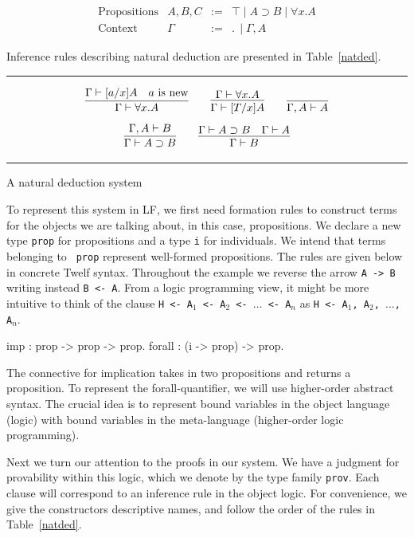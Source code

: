 \documentclass{acmconf}
\newcommand{\figfoot}{\vspace{1ex}\hrule}
\newcommand{\fighead}{\hrule\vspace{1.5ex}}
\newcommand{\impl}{\supset}
\newcommand{\ldot}{.\,}
\begin{document}
\[
\begin{array}{llll}
\mbox{Propositions} & A,B, C & := & \top \mid A \impl B \mid \forall x.A \\
\mbox{Context} & \Gamma & := & \ldot \mid \Gamma,  A
\end{array}
\]

Inference rules describing natural deduction are presented in Table~\ref{natded}.

\begin{table}[h]
\fighead
\[
\infer{\Gamma\vdash \forall x. A}
{\Gamma\vdash [a/x]A & a \mbox{ is new}}
\qquad
\infer{\Gamma\vdash [T/x]A}
{\Gamma\vdash \forall x.A}
\qquad
\infer{\Gamma, A \vdash A}
{}
\]
\[
\infer{\Gamma\vdash A\impl B}
{\Gamma,A\vdash B}
\qquad
\infer{\Gamma\vdash B}
{\Gamma\vdash A\impl B
\quad
\Gamma\vdash A}
\]
\figfoot
\caption{\label{natded}A natural deduction system}
\end{table}

To represent this system in LF, we first need formation rules to
construct terms for the objects we are talking about, in this case,
propositions. We declare a new type {\tt prop} for propositions and a
type {\tt i} for individuals. We intend that terms belonging to {\tt
  prop} represent well-formed propositions. The rules are given below
in concrete Twelf syntax. Throughout the example we reverse the arrow {\tt{A -> B}} writing instead {\tt{B <- A}}. From a logic programming view, it might be more intuitive to think of the clause {\tt{H <- A$_1$ <- A$_2$ <- $\ldots$ <- A$_n$}} as {\tt{H <- A$_1$, A$_2$, $\ldots$, A$_n$}}.


\begin{code}
imp    : prop -> prop -> prop.
forall : (i -> prop) -> prop.
\end{code}

The connective for implication takes in two propositions and returns a
proposition. To represent the forall-quantifier, we will use
higher-order abstract syntax. The crucial idea is to represent bound
variables in the object language (logic) with bound variables in the
meta-language (higher-order logic programming). 

Next we turn our attention to the proofs in our system. We have a
judgment for provability within this logic, which we denote by the
type family {\tt prov}.
%
%
Each clause will correspond to an inference rule in the object
logic. For convenience, we give the constructors 
descriptive names, and follow the order of the rules in
Table~\ref{natded}. 
\end{document}
